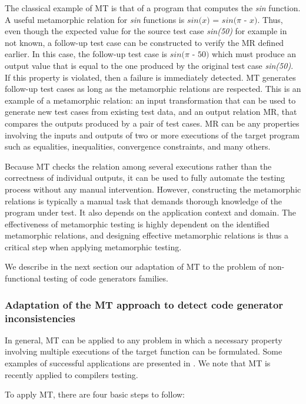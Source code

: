 The classical example of MT is that of a program that computes the \textit{sin} function. A useful metamorphic relation for \textit{sin} functions is $\textit{sin(x) = sin($\pi$ - x)}$. Thus, even though the expected value for the source test case \textit{sin(50)} for example in not known, a follow-up test case can be constructed to verify the MR defined earlier. In this case, the follow-up test case is $\textit{sin($\pi$ - 50)}$ which must produce an output value that is equal to the one produced by the original test case \textit{sin(50)}. If this property is violated, then a failure is immediately detected.
MT generates follow-up test cases as long as the metamorphic relations are respected.
This is an example of a metamorphic relation: an input transformation that can be used to generate new test cases from existing test data, and an output relation MR, that compares the outputs produced by a pair of test cases.
MR can be any properties involving the inputs and outputs of two or more executions of the target program such as equalities, inequalities, convergence constraints, and many others.

Because MT checks the relation among several executions rather than the correctness of individual outputs, it can be used to fully automate the testing process without any manual intervention. 
However, constructing the metamorphic relations is typically a manual task that demands thorough knowledge of the program under test. It also depends on the application context and domain. 
The effectiveness of metamorphic testing is highly dependent on the identified metamorphic relations, and designing effective metamorphic relations is thus a critical step when applying metamorphic testing.

We describe in the next section our adaptation of MT to the problem of non-functional testing of code generators families.

\subsubsection{Adaptation of the MT approach to detect code generator inconsistencies}
In general, MT can be applied to any problem in which a necessary property involving multiple executions of the target function can be formulated. Some examples of successful applications are presented in \cite{zhou2004metamorphic}. We note that MT is recently applied to compilers testing\cite{donaldson2016metamorphic,tao2010automatic,le2014compiler}.

To apply MT, there are four basic steps to follow:

